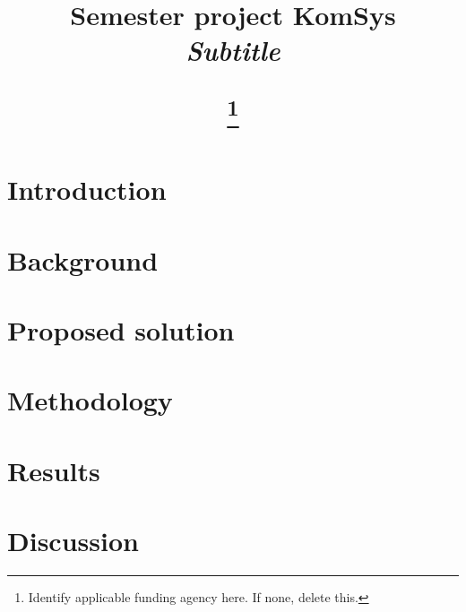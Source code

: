 \documentclass[conference]{IEEEtran}
\begin{document}
\title{Semester project KomSys\\
{\large{\textit{Subtitle}}}

\thanks{Identify applicable funding agency here. If none, delete this.}
}



\maketitle

\begin{abstract}

\end{abstract}

\begin{IEEEkeywords}

\end{IEEEkeywords}

\section{Introduction}


\section{Background}


\section{Proposed solution}


\section{Methodology}


\section{Results}


\section{Discussion}

\end{document}
